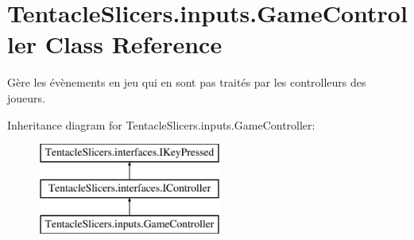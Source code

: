 \hypertarget{class_tentacle_slicers_1_1inputs_1_1_game_controller}{}\section{Tentacle\+Slicers.\+inputs.\+Game\+Controller Class Reference}
\label{class_tentacle_slicers_1_1inputs_1_1_game_controller}


Gère les évènements en jeu qui en sont pas traités par les controlleurs des joueurs.  


Inheritance diagram for Tentacle\+Slicers.\+inputs.\+Game\+Controller\+:\begin{figure}[H]
\begin{center}
\leavevmode
\includegraphics[height=3.000000cm]{class_tentacle_slicers_1_1inputs_1_1_game_controller}
\end{center}
\end{figure}
